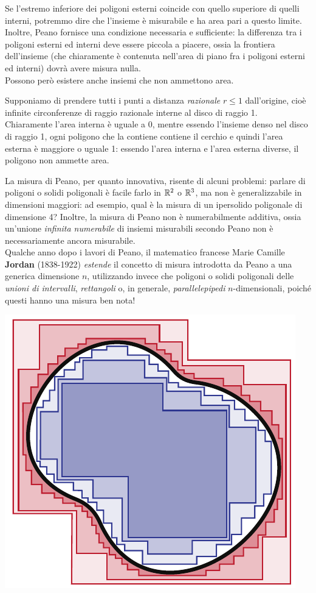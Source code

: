 Se l'estremo inferiore dei poligoni esterni coincide con quello superiore di quelli interni, potremmo dire che l'insieme è misurabile e ha area pari a questo limite.
Inoltre, Peano fornisce una condizione necessaria e sufficiente: la differenza tra i poligoni esterni ed interni deve essere piccola a piacere, ossia la frontiera dell'insieme (che chiaramente è contenuta nell'area di piano fra i poligoni esterni ed interni) dovrà avere misura nulla.\\
Possono però esistere anche insiemi che non ammettono area. 
\begin{example}
	Supponiamo di prendere tutti i punti a distanza \textit{razionale} $r\leq 1$ dall'origine, cioè infinite circonferenze di raggio razionale interne al disco di raggio 1.\\
	Chiaramente l'area interna è uguale a 0, mentre essendo l'insieme denso nel disco di raggio 1, ogni poligono che la contiene contiene il cerchio e quindi l'area esterna è maggiore o uguale 1: essendo l'area interna e l'area esterna diverse, il poligono non ammette area.
\end{example}
La misura di Peano, per quanto innovativa, risente di alcuni problemi: parlare di poligoni o solidi poligonali è facile farlo in $\mathbb{R}^2$ o $\mathbb{R}^3$, ma non è generalizzabile in dimensioni maggiori: ad esempio, qual è la misura di un ipersolido poligonale di dimensione 4? Inoltre, la misura di Peano non è numerabilmente additiva, ossia un'unione \textit{infinita numerabile} di insiemi misurabili secondo Peano non è necessariamente ancora misurabile.\\
Qualche anno dopo i lavori di Peano, il matematico francese Marie Camille \textbf{Jordan} (1838-1922) \textit{estende} il concetto di misura introdotta da Peano a una generica dimensione $n$, utilizzando invece che poligoni o solidi poligonali delle \textit{unioni di intervalli}, \textit{rettangoli} o, in generale, \textit{parallelepipedi} $n$-dimensionali, poiché questi hanno una misura ben nota!
\begin{center}
	\includegraphics[trim=0cm 0cm 0cm 0cm, clip, scale=0.71]{images/peanoparallelepipedi.pdf}
\end{center}
